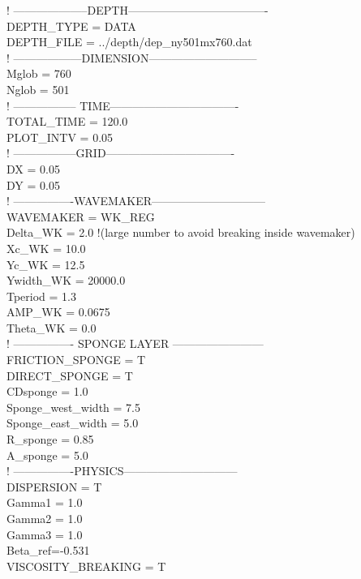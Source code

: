 \documentclass[11pt]{article}
\begin{document}
  ! --------------------DEPTH------------------------------------- \\
DEPTH\_TYPE = DATA \\
DEPTH\_FILE = ../depth/dep\_ny501mx760.dat  \\

  ! ------------------DIMENSION----------------------------- \\
Mglob = 760 \\
Nglob = 501 \\

  ! ----------------- TIME---------------------------------- \\
  TOTAL\_TIME = 120.0 \\
PLOT\_INTV = 0.05 \\

  ! -----------------GRID----------------------------------  \\
  DX = 0.05  \\
DY = 0.05  \\

  ! ----------------WAVEMAKER------------------------------  \\
  WAVEMAKER = WK\_REG \\
  Delta\_WK = 2.0   !(large number to avoid breaking inside wavemaker) \\
  Xc\_WK = 10.0 \\
Yc\_WK = 12.5 \\
Ywidth\_WK = 20000.0 \\
Tperiod = 1.3  \\
AMP\_WK = 0.0675 \\
Theta\_WK = 0.0 \\

  ! ---------------- SPONGE LAYER ------------------------ \\
  FRICTION\_SPONGE = T \\
DIRECT\_SPONGE = T \\
CDsponge = 1.0 \\
Sponge\_west\_width =  7.5 \\
Sponge\_east\_width =  5.0 \\
R\_sponge = 0.85 \\
A\_sponge = 5.0 \\

! ----------------PHYSICS------------------------------ \\
DISPERSION = T \\
Gamma1 = 1.0 \\
Gamma2 = 1.0  \\
Gamma3 = 1.0  \\
Beta\_ref=-0.531 \\
VISCOSITY\_BREAKING = T \\
\end{document}
